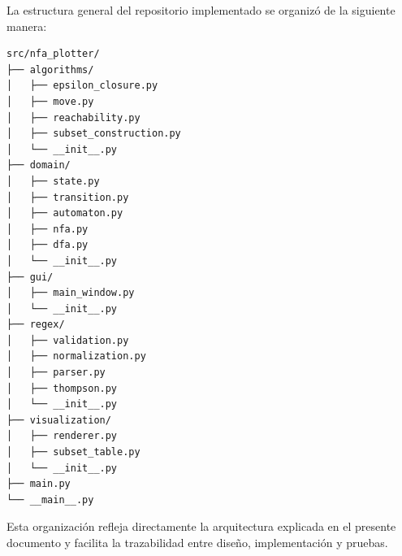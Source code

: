 \documentclass[12pt]{article}
\begin{document}
La estructura general del repositorio implementado se organizó de la siguiente manera:

\begin{verbatim}
src/nfa_plotter/
├── algorithms/
│   ├── epsilon_closure.py
│   ├── move.py
│   ├── reachability.py
│   ├── subset_construction.py
│   └── __init__.py
├── domain/
│   ├── state.py
│   ├── transition.py
│   ├── automaton.py
│   ├── nfa.py
│   ├── dfa.py
│   └── __init__.py
├── gui/
│   ├── main_window.py
│   └── __init__.py
├── regex/
│   ├── validation.py
│   ├── normalization.py
│   ├── parser.py
│   ├── thompson.py
│   └── __init__.py
├── visualization/
│   ├── renderer.py
│   ├── subset_table.py
│   └── __init__.py
├── main.py
└── __main__.py
\end{verbatim}

Esta organización refleja directamente la arquitectura explicada en el presente documento y facilita la trazabilidad entre diseño, implementación y pruebas.
\end{document}
